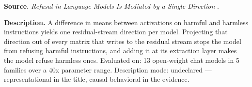 
\textbf{Source.} \emph{Refusal in Language Models Is Mediated by a Single Direction} \citep{arditi2024refusal}.

\textbf{Description.} A difference in means between activations on harmful and harmless instructions yields one residual-stream direction per model. Projecting that direction out of every matrix that writes to the residual stream stops the model from refusing harmful instructions, and adding it at its extraction layer makes the model refuse harmless ones. Evaluated on: 13 open-weight chat models in 5 families over a 40x parameter range. Description mode: undeclared --- representational in the title, causal-behavioral in the evidence.

\vspace{4pt}
